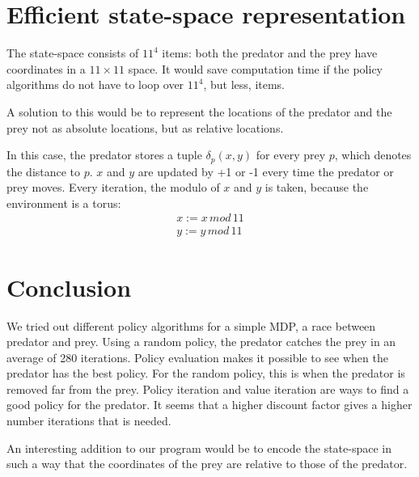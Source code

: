 \documentclass{article}
\begin{document}
\section{Efficient state-space representation}
The state-space consists of $11^4$ items: both the predator and the prey have coordinates in a $11 \times 11$ space. It would save computation time if the policy algorithms do not have to loop over $11^4$, but less, items.

A solution to this would be to represent the locations of the predator and the prey not as absolute locations, but as relative locations.

In this case, the predator stores a tuple $\delta_{p}(x,y)$ for every prey $p$, which denotes the distance to $p$. $x$ and $y$ are updated by +1 or -1 every time the predator or prey moves. Every iteration, the modulo of $x$ and $y$ is taken, because the environment is a torus:
\begin{align}
x := x\,mod\,11\\
y := y\,mod\,11
\end{align}

\section{Conclusion}
We tried out different policy algorithms for a simple MDP, a race between predator and prey. Using a random policy, the predator catches the prey in an average of 280 iterations. Policy evaluation makes it possible to see when the predator has the best policy. For the random policy, this is when the predator is removed far from the prey. Policy iteration and value iteration are ways to find a good policy for the predator. It seems that a higher discount factor gives a higher number iterations that is needed.

An interesting addition to our program would be to encode the state-space in such a way that the coordinates of the prey are relative to those of the predator. 
\end{document}
